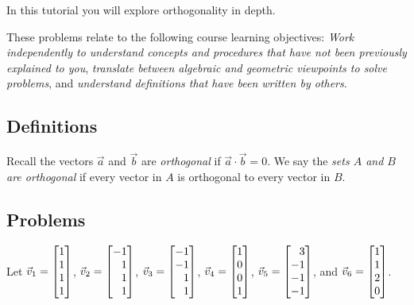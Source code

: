 		\begin{objectives}
	In this tutorial you will explore orthogonality in depth.

	These problems relate to the following course learning objectives:
	\textit{Work independently to understand concepts and procedures that have not been previously
		explained to you},
		\textit{translate between algebraic and geometric viewpoints to solve problems}, and
		\textit{understand definitions that have been written by others}.
		\end{objectives}

		\vspace{-.4cm}
\subsection*{Definitions}
		Recall the vectors $\vec a$ and $\vec b$ are \emph{orthogonal} if $\vec a\cdot \vec b=0$.
		We say the \emph{sets $A$ and $B$ are orthogonal} if every vector in $A$ is orthogonal to every
		vector in $B$.

		\vspace{-.4cm}
\subsection*{Problems}
Let $\vec v_1=\mat{1\\1\\1\\1}$,
		$\vec v_2=\mat{-1\\1\\1\\1}$,
		$\vec v_3=\mat{-1\\-1\\1\\1}$,
		$\vec v_4=\mat{1\\0\\0\\1}$,
		$\vec v_5=\mat{3\\-1\\-1\\-1}$, and
		$\vec v_6=\mat{1\\1\\2\\0}$.

